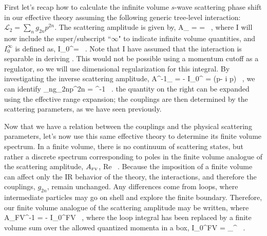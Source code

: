 First let's recap how to calculate the infinite volume $s$-wave scattering phase shift in our effective theory assuming the following generic tree-level interaction: ${\mathcal{ L}}_2 = \sum_n g_{2n}p^{2n}$. The scattering amplitude is given by,
\beq
\label{eq:Aluscher}
A_{\infty} =  =  \ ,
\eeq
where I will now include the super/subscript ``$\infty$" to indicate infinite volume quantities, and $I_0^{\infty}$ is defined as,
\beq
I_0^{\infty}=\int {}  \ .
\eeq
Note that I have assumed that the interaction is separable in deriving . This would not be possible using a momentum cutoff as a regulator, so we will use dimensional regularization for this integral. By investigating the inverse scattering amplitude,
\beq
A^{-1}_{\infty} =  - I_0^{\infty} = (p\cot\delta - i p) \ ,
\eeq 
we can identify
\beq
\label{eq:C2n}
\sum_ng_{2n}p^{2n} = ^{-1} \ .
\eeq
the quantity on the right can be expanded using the effective range expansion; the couplings are then determined by the scattering parameters, as we have seen previously.

Now that we have a relation between the couplings and the physical scattering parameters, let's now use this same effective theory to determine its finite volume spectrum. In a finite volume, there is no continuum of scattering states, but rather a discrete spectrum corresponding to poles in the finite volume analogue of the scattering amplitude, $A_{\mbox{\tiny FV}}$,
\beq
\label{eq:luschereig}
\mbox{Re} \ .
\eeq
Because the imposition of a finite volume can affect only the IR behavior of the theory, the interactions, and therefore the couplings, $g_{2n}$, remain unchanged. Any differences come from loops, where intermediate particles may go on shell and explore the finite boundary. Therefore, our finite volume analogue of the scattering amplitude may be written,
where
\beq
A_{\mbox{\tiny FV}}^{-1} =  - I_0^{\mbox{\tiny FV}} \ ,
\eeq
where the loop integral has been replaced by a finite volume sum over the allowed quantized momenta in a box,
\beq
I_0^{\mbox{\tiny FV}} =  \sum_{}^{\Lambda}  \ .
\eeq

